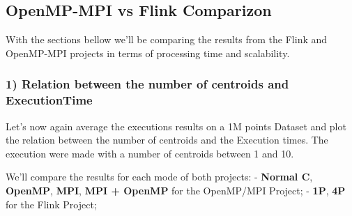 \documentclass[11pt]{article}
\begin{document}
    \hypertarget{openmp-mpi-vs-flink-comparizon}{%
\subsection{OpenMP-MPI vs Flink
Comparizon}\label{openmp-mpi-vs-flink-comparizon}}

    With the sections bellow we'll be comparing the results from the Flink
and OpenMP-MPI projects in terms of processing time and scalability.

    \hypertarget{relation-between-the-number-of-centroids-and-executiontime}{%
\subsubsection{1) Relation between the number of centroids and
ExecutionTime}\label{relation-between-the-number-of-centroids-and-executiontime}}

    Let's now again average the executions results on a 1M points Dataset
and plot the relation between the number of centroids and the Execution
times. The execution were made with a number of centroids between 1 and
10.

We'll compare the results for each mode of both projects: -
\textbf{Normal C}, \textbf{OpenMP}, \textbf{MPI}, \textbf{MPI + OpenMP}
for the OpenMP/MPI Project; - \textbf{1P}, \textbf{4P} for the Flink
Project;
\end{document}
